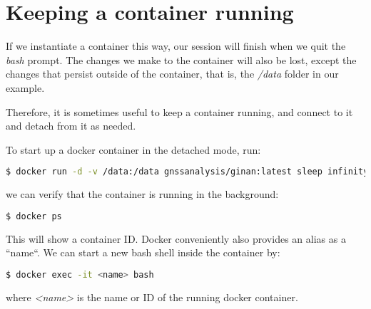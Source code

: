 \section{Keeping a container running}
If we instantiate a container this way, our session will finish when we quit the \emph{bash} prompt.
The changes we make to the container will also be lost, except the changes that persist outside
of the container, that is, the \emph{/data} folder in our example.

Therefore, it is sometimes useful to keep a container running, and connect to it and detach
from it as needed.

To start up a docker container in the detached mode, run:
\begin{lstlisting}[language=bash]
$ docker run -d -v /data:/data gnssanalysis/ginan:latest sleep infinity
\end{lstlisting}
we can verify that the container is running in the background:
\begin{lstlisting}[language=bash]
$ docker ps
\end{lstlisting}
This will show a container ID. Docker conveniently also provides an alias as a ``name``.
We can start a new bash shell inside the container by:
\begin{lstlisting}[language=bash]
$ docker exec -it <name> bash
\end{lstlisting}
where \emph{<name>} is the name or ID of the running docker container.
